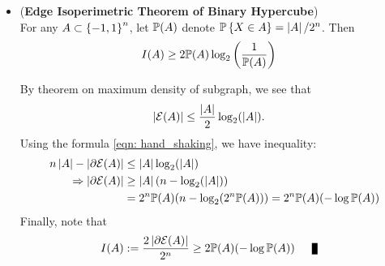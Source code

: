 \documentclass[11pt]{article}
\begin{document}
\begin{itemize}
\item \begin{theorem} (\textbf{Edge Isoperimetric Theorem of Binary Hypercube}) \citep{boucheron2013concentration}\\
For any $A \subset \left\{-1, 1\right\}^n$, let ${\mathbb P}(A)$ denote ${\mathbb P}\left\{X \in A\right\} = \left\lvert A \right\rvert/2^n$. Then
\begin{align}
I(A) &\ge 2 {\mathbb P}(A)\log_2\left(\frac{1}{{\mathbb P}(A)}\right) \label{ineqn: edge_isoperimetric_inequality}
\end{align}
\end{theorem} By theorem on maximum density of subgraph, we see that 
\begin{align*}
\left\lvert {\mathcal E}(A) \right\rvert &\le \frac{\left\lvert A \right\rvert}{2} \log_2(\left\lvert A \right\rvert).
\end{align*} Using the formula \eqref{eqn: hand_shaking}, we have inequality:
\begin{align*}
n\left\lvert A \right\rvert - \left\lvert \partial {\mathcal E}(A) \right\rvert &\le \left\lvert A \right\rvert  \log_2(\left\lvert A \right\rvert) \\
\Rightarrow \left\lvert \partial {\mathcal E}(A) \right\rvert &\ge \left\lvert A \right\rvert (n -  \log_2(\left\lvert A \right\rvert)) \\
&= 2^n {\mathbb P}(A) (n - \log_2(2^n {\mathbb P}(A))) = 2^n {\mathbb P}(A) (- \log {\mathbb P}(A))
\end{align*} Finally, note that 
\begin{align*}
I(A) &:= \frac{2 \abs{\partial \cE(A)}}{2^n} \ge 2 \bP(A) (- \log \bP(A)) \qed
\end{align*}
\end{itemize}
\end{document}
